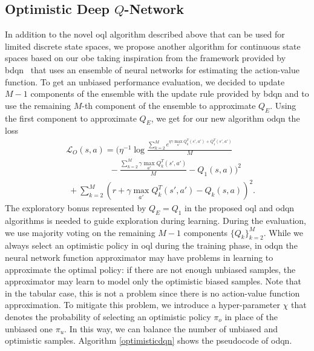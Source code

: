 \subsection{Optimistic Deep $Q$-Network}\label{sec:proposedalg}
In addition to the novel \gls{oql} algorithm described above that can be used for limited discrete state spaces, we
propose another algorithm for continuous state spaces based on our \gls{obe} taking inspiration from the framework provided by \gls{bdqn}~\cite{osband2017deep}
that uses an ensemble of neural networks for estimating the action-value function.
To get an unbiased performance evaluation, we decided to update $M-1$ components of the ensemble with the update rule provided by \gls{bdqn} and to use the remaining $M$-th component of the ensemble to approximate $Q_E$. Using the first component to approximate $Q_E$, we get for our new algorithm \gls{odqn} the loss
\begin{eqnarray}
	&\mathcal{L}_O(s,a) = (\eta^{-1}\log \frac{\sum_{k=2}^M
	 e^{\eta\gamma\max_{a'}Q_k^T(s',a')+ Q_1^T(s',a')}}{M}\nonumber \\
&\qquad\qquad\;\;\;\;  -  \frac{\sum_{k=2}^M  \gamma\max_{a'}Q^T_k(s',a')}{M} -Q_1(s,a))^2\nonumber \\
&\;  + \sum_{k=2}^M (r + \gamma\max_{a'}Q^T_k(s',a') -
	 Q_k(s,a))^2.  \label{optimisticloss}
\end{eqnarray}
The exploratory bonus represented by $Q_E = Q_1$ in the proposed \gls{oql} and \gls{odqn} algorithms is needed to
guide exploration during learning. During the evaluation, we use majority voting on the remaining $M-1$
components $\{Q_k\}_{k=2}^M$. While we always select an optimistic policy in \gls{oql} during the training phase, in
\gls{odqn} the neural network function approximator may have problems in learning to approximate the optimal
policy: if there are not enough unbiased samples, the approximator may learn to model only the optimistic
biased samples. Note that in the tabular case, this is not a problem since there is no action-value function
approximation. To mitigate this problem, we introduce a hyper-parameter $\chi$ that denotes the probability of selecting an optimistic policy $\pi_o$ in place of the unbiased one $\pi_u$. In this way, we can balance the number of unbiased and optimistic samples.
Algorithm \ref{optimisticdqn} shows the pseudocode of \gls{odqn}. 
